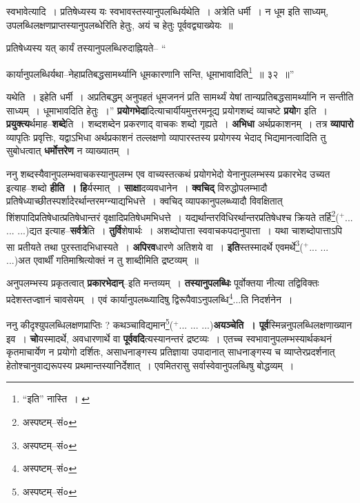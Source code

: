 \documentclass[article,12pt,a4paper]{memoir}
\newcommand{\add}[1]{($^{+}$#1)}
\begin{document}
	स्वभावेत्यादि । प्रतिषेध्यस्य यः स्वभावस्तस्यानुपलब्धिर्यथेति । अत्रेति धर्मी । न धूम इति साध्यम्, उपलब्धिलक्षणप्राप्तस्यानुपलब्धेरिति हेतुः, अयं च हेतुः पूर्ववद्व्याख्येयः ॥ 
	  
	प्रतिषेध्यस्य यत् कार्यं तस्यानुपलब्धिरुदाह्नियते-- “
	  
	कार्यानुपलब्धिर्यथा--नेहाप्रतिबद्धसामर्थ्यानि धूमकारणानि सन्ति, धूमाभावादिति\footnote{“इति” नास्ति । \cite{dp-msB} \cite{dp-edP} \cite{dp-edH} \cite{dp-edE} \cite{dp-edN}} ॥ ३२ ॥” 
	  
	यथेति । इहेति धर्मी । अप्रतिबद्धम् अनुपहतं धूमजननं प्रति सामर्थ्यं येषां तान्यप्रतिबद्धसामर्थ्यानि न सन्तीति साध्यम् । धूमाभावदिति हेतुः ।” \textbf{प्रयोगभेदा}दित्याचार्यीयमुत्तरमनूद्य प्रयोगशब्दं व्याचष्टे \textbf{प्रयो}ग इति । \textbf{प्रयुक्त्य}र्थमाह--\textbf{शब्दे}ति । शब्दशब्देन प्रकरणाद् वाचकः शब्दो गृह्यते । \textbf{अभिधा} अर्थप्रकाशनम् । तत्र \textbf{व्यापारो} व्यापृतिः प्रवृत्तिः, यद्वाऽभिधा अर्थप्रकाशनं तल्लक्षणो व्यापारस्तस्य प्रयोगस्य भेदाद् भिद्यमानत्वादिति तु सुबोधत्वात् \textbf{धर्मोत्तरेण} न व्याख्यातम् ।
	\pend
      

	  \pstart ननु शब्दस्यैवानुपलम्भवाचकस्यानुपलम्भ एव वाच्यस्तत्कथं प्रयोगभेदो येनानुपलम्भस्य प्रकारभेद उच्यत इत्याह--शब्दो \textbf{हीति । हि}र्यस्मात् । \textbf{साक्षा}दव्यवधानेन । \textbf{क्वचिद्} विरुद्धोपलम्भादौ प्रतिषेध्याच्छीतस्पर्शादेरर्थान्तरमग्न्याद्यभिधत्ते । क्वचिद् व्यापकानुपलब्ध्यादौ विवक्षितात् शिंशपादिप्रतिषेधात्प्रतिषेधान्तरं वृक्षादिप्रतिषेधमभिधत्ते । यद्यर्थान्तरविधिरर्थान्तरप्रतिषेधश्च क्रियते तर्हि\footnote{अस्पष्टम्--सं०}\add{... ... ...}द्यत इत्याह--\textbf{सर्वत्रे}ति । \textbf{तुर्वि}शेषार्थः । अशब्दोपात्ता स्ववाचकपदानुपात्ता । यथा चाशब्दोपात्ताऽपि सा प्रतीयते तथा पुरस्तादभिधास्यते । \textbf{अपिरव}धारणे अतिशये वा । \textbf{इति}स्तस्मादर्थे एवमर्थे\footnote{अस्पष्टम्--सं०}\add{... ... ...}अत एवार्थीं गतिमाश्रित्योक्तं न तु शाब्दीमिति द्रष्टव्यम् ॥
	\pend
      

	  \pstart अनुपलम्भस्य प्रकृतत्वात् \textbf{प्रकारभेदान्}--इति मन्तव्यम् । \textbf{तस्यानुपलब्धिः} पूर्वोक्तया नीत्या तद्विविक्तः प्रदेशस्तज्ज्ञानं चावसेयम् । एवं कार्यानुपलब्ध्यादिषु द्विरूपैवाऽनुपलब्धि\footnote{अस्पष्टम्--सं०}...ति निदर्शनेन ।
	\pend
      

	  \pstart ननु कीदृश्युपलब्धिलक्षणप्राप्तिः ? कथञ्चाविद्यमान\footnote{अस्पष्टम्--सं०}\add{... ... ...}\textbf{अयञ्चेति । पूर्व}स्मिन्ननुपलब्धिलक्षणाख्यान इव । \textbf{चो}\leavevmode{}यस्मादर्थे, अवधारणार्थे वा \textbf{पूर्ववदि}त्यस्यानन्तरं द्रष्टव्यः । एतच्च स्वभावानुपलम्भस्यार्थकथनं कृतमाचार्येण न प्रयोगो दर्शितः, असाधनाङ्गस्य प्रतिज्ञाया उपादानात् साधनाङ्गस्य च व्याप्तेरप्रदर्शनात् हेतोश्चानुवाद्यरूपस्य प्रथमान्तस्यानिर्देशात् । एवमितरासु सर्वास्वेवानुपलब्धिषु बोद्धव्यम् ।
	\pend
      
\end{document}
